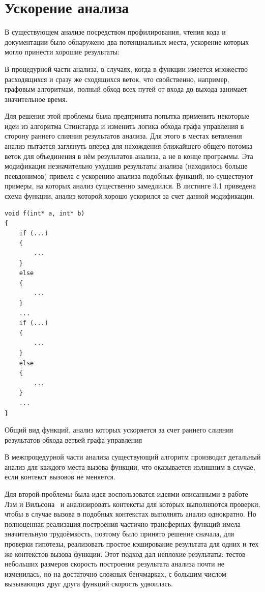 \section{Ускорение анализа}

В существующем анализе посредством профилирования, чтения кода и документации было обнаружено два потенциальных места, ускорение которых могло принести хорошие результаты:

В процедурной части анализа, в случаях, когда в функции имеется множество расходящихся и сразу же сходящихся веток, что свойственно, например, графовым алгоритмам, полный обход всех путей от входа до выхода занимает значительное время.

Для решения этой проблемы была предпринята попытка применить некоторые идеи из алгоритма Стинсгарда и изменить логика обхода графа управления в сторону раннего слияния результатов анализа. Для этого в местах ветвления анализ пытается заглянуть вперед для нахождения ближайшего общего потомка веток для объединения в нём результатов анализа, а не в конце программы. Эта модификация незначительно ухудшив результаты анализа (находилось больше псевдонимов) привела с ускорению анализа подобных функций, но существуют примеры, на которых анализ существенно замедлился. В листинге 3.1 приведена схема функции, анализ которой хорошо ускорился за счет данной модификации.

\begin{ListingEnv}[H]
\begin{lstlisting}
void f(int* a, int* b)
{
    if (...)
    {
        ...
    }
    else
    {
        ...
    }
    ...
    if (...)
    {
        ...
    }
    else
    {
        ...
    }
    ...
}
\end{lstlisting}
\caption{Общий вид функций, анализ которых ускоряется за счет раннего слияния результатов обхода ветвей графа управления}
\label{list:otherlevels}
\end{ListingEnv}

В межпроцедурной части анализа существующий алгоритм производит детальный анализ для каждого места вызова функции, что оказывается излишним в случае, если контекст вызовов не меняется.

Для второй проблемы была идея воспользоватся идеями описанными в работе Лэм и Вильсона~\autocite{WilsonLamSIGPLAN95} и анализировать контексты для которых выполняются проверки, чтобы в случае вызова в подобных контекстах выполнять анализ однократно. Но полноценная реализация построения частично трансферных функций имела значительную трудоёмкость, поэтому было принято решение сначала, для проверки гипотезы, реализовать простое кэширование результата для одних и тех же контекстов вызова функции. Этот подход дал неплохие результаты: тестов небольших размеров скорость построения результата анализа почти не изменилась, но на достаточно сложных бенчмарках, с большим числом вызывающих друг друга функций скорость удвоилась.

